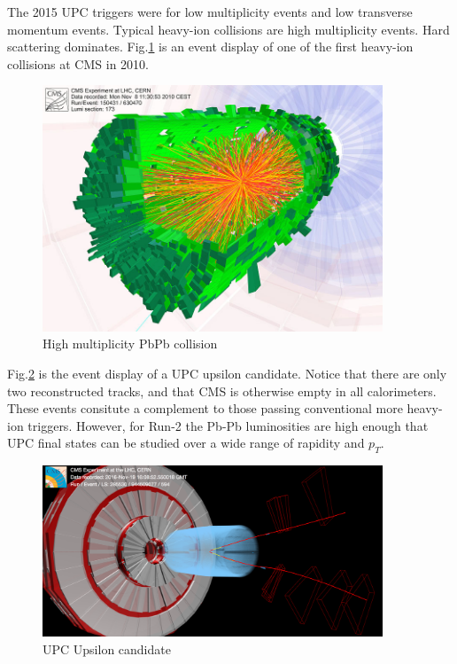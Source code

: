 The 2015 UPC triggers were for low multiplicity events and low transverse momentum events. Typical heavy-ion collisions are high multiplicity events. Hard scattering dominates. Fig.\ref{fig:eventdisplayHI} is an event display of one of the first heavy-ion collisions at CMS in 2010.

\begin{figure}[h!]
\begin{centering}
\includegraphics[width=4in]{Chapter3/importfigs/cms_firstleadcoll.jpg}
\par\end{centering}
\caption{High multiplicity PbPb collision \label{fig:eventdisplayHI}}
\end{figure}

Fig.\ref{fig:eventdisplayUPCUps} is the event display of a UPC upsilon candidate. Notice that there are only two reconstructed tracks, and that CMS is otherwise empty in all calorimeters. These events consitute a complement to those passing conventional more heavy-ion triggers. However, for Run-2 the Pb-Pb luminosities are high enough that UPC final states can be studied over a wide range of rapidity and $p_T$.

\begin{figure}[h!]
\begin{centering}
\includegraphics[width=4in]{Chapter3/importfigs/upcJpsi_run285530_lumi594_event944509077_v0.png}
\par\end{centering}
\caption{UPC Upsilon candidate \label{fig:eventdisplayUPCUps}}
\end{figure}

